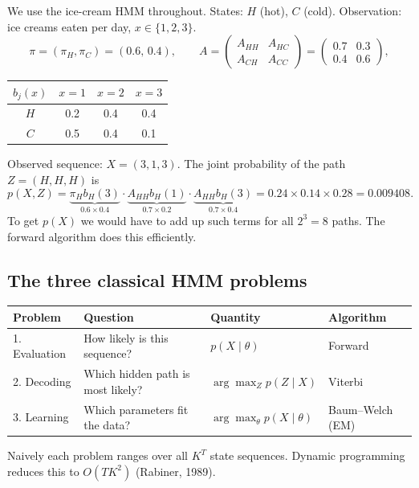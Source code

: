 \documentclass[11pt,a4paper]{article}
\begin{document}
\begin{example}
We use the ice-cream HMM throughout. States: $H$ (hot), $C$ (cold). Observation: ice creams eaten per day, $x\in\{1,2,3\}$.
\[
\pi=(\pi_H,\pi_C)=(0.6,\,0.4),\qquad
A=\begin{pmatrix}A_{HH}&A_{HC}\\A_{CH}&A_{CC}\end{pmatrix}=\begin{pmatrix}0.7&0.3\\0.4&0.6\end{pmatrix},
\]
\begin{center}
\begin{tabular}{@{}cccc@{}}
\toprule
$b_j(x)$ & $x=1$ & $x=2$ & $x=3$\\
\midrule
$H$ & 0.2 & 0.4 & 0.4\\
$C$ & 0.5 & 0.4 & 0.1\\
\bottomrule
\end{tabular}
\end{center}
Observed sequence: $X=(3,1,3)$. The joint probability of the path $Z=(H,H,H)$ is
\[
p(X,Z)=\underbrace{\pi_H b_H(3)}_{0.6\times0.4}\cdot\underbrace{A_{HH}b_H(1)}_{0.7\times0.2}\cdot\underbrace{A_{HH}b_H(3)}_{0.7\times0.4}=0.24\times0.14\times0.28=\mathbf{0.009408}.
\]
To get $p(X)$ we would have to add up such terms for all $2^3=8$ paths. The forward algorithm does this efficiently.
\end{example}

\subsection{The three classical HMM problems}

\begin{center}
\begin{tabular}{@{}llll@{}}
\toprule
Problem & Question & Quantity & Algorithm\\
\midrule
1. Evaluation & How likely is this sequence? & $p(X\mid\theta)$ & Forward\\
2. Decoding & Which hidden path is most likely? & $\arg\max_Z p(Z\mid X)$ & Viterbi\\
3. Learning & Which parameters fit the data? & $\arg\max_\theta p(X\mid\theta)$ & Baum--Welch (EM)\\
\bottomrule
\end{tabular}
\end{center}
Naively each problem ranges over all $K^T$ state sequences. Dynamic programming reduces this to $O(TK^2)$ (Rabiner, 1989).
\end{document}
